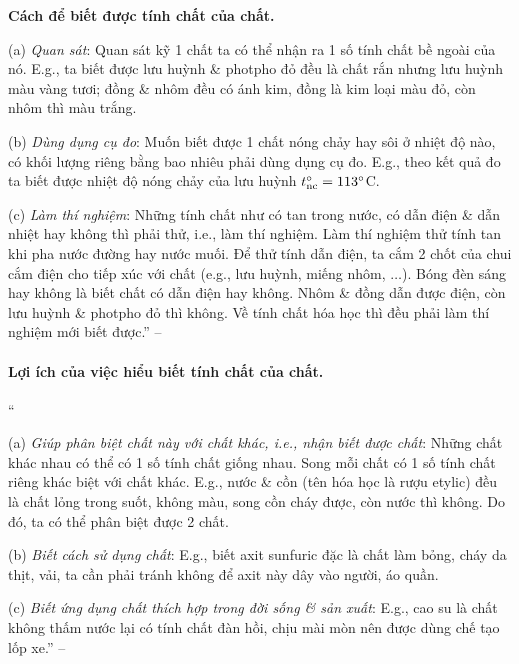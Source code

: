 \documentclass{article}
\numberwithin{equation}{section}
\begin{document}
\textbf{Cách để biết được tính chất của chất.}
\begin{enumerate*}
	\item[(a)] \textit{Quan sát}: Quan sát kỹ 1 chất ta có thể nhận ra 1 số tính chất bề ngoài của nó. E.g., ta biết được lưu huỳnh \& photpho đỏ đều là chất rắn nhưng lưu huỳnh màu vàng tươi; đồng \& nhôm đều có ánh kim, đồng là kim loại màu đỏ, còn nhôm thì màu trắng.
	\item[(b)] \textit{Dùng dụng cụ đo}: Muốn biết được 1 chất nóng chảy hay sôi ở nhiệt độ nào, có khối lượng riêng bằng bao nhiêu phải dùng dụng cụ đo. E.g., theo kết quả đo ta biết được nhiệt độ nóng chảy của lưu huỳnh $t_{\rm nc}^\circ = 113^\circ$C.
	\item[(c)] \textit{Làm thí nghiệm}: Những tính chất như có tan trong nước, có dẫn điện \& dẫn nhiệt hay không thì phải thử, i.e., làm thí nghiệm. Làm thí nghiệm thử tính tan khi pha nước đường hay nước muối. Để thử tính dẫn điện, ta cắm 2 chốt của chui cắm điện cho tiếp xúc với chất (e.g., lưu huỳnh, miếng nhôm, $\ldots$). Bóng đèn sáng hay không là biết chất có dẫn điện hay không. Nhôm \& đồng dẫn được điện, còn lưu huỳnh \& photpho đỏ thì không. Về tính chất hóa học thì đều phải làm thí nghiệm mới biết được.'' -- \cite[p. 8]{SGK_Hoa_Hoc_8}
\end{enumerate*}

\paragraph{Lợi ích của việc hiểu biết tính chất của chất.}
``\begin{enumerate*}
	\item[(a)] \textit{Giúp phân biệt chất này với chất khác, i.e., nhận biết được chất}: Những chất khác nhau có thể có 1 số tính chất giống nhau. Song mỗi chất có 1 số tính chất riêng khác biệt với chất khác. E.g., nước \& cồn (tên hóa học là rượu etylic) đều là chất lỏng trong suốt, không màu, song cồn cháy được, còn nước thì không. Do đó, ta có thể phân biệt được 2 chất.
	\item[(b)] \textit{Biết cách sử dụng chất}: E.g., biết axit sunfuric đặc là chất làm bỏng, cháy da thịt, vải, ta cần phải tránh không để axit này dây vào người, áo quần.
	\item[(c)] \textit{Biết ứng dụng chất thích hợp trong đời sống \& sản xuất}: E.g., cao su là chất không thấm nước lại có tính chất đàn hồi, chịu mài mòn nên được dùng chế tạo lốp xe.'' -- \cite[p. 8]{SGK_Hoa_Hoc_8}
\end{enumerate*}
\end{document}
